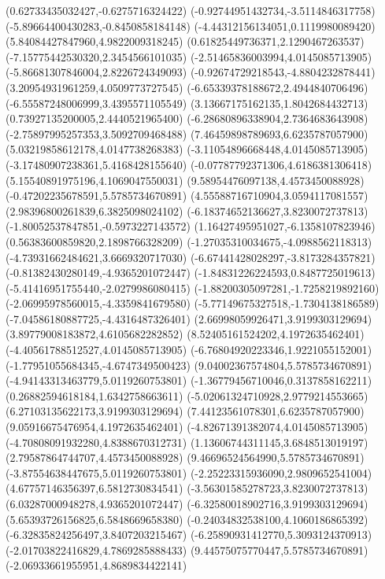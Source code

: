 {(0.62733435032427,-0.6275716324422)
(-0.92744951432734,-3.5114846317758)
(-5.89664400430283,-0.8450858184148)
(-4.44312156134051,0.1119980089420)
(5.84084427847960,4.9822009318245)
(0.61825449736371,2.1290467263537)
(-7.15775442530320,2.3454566101035)
(-2.51465836003994,4.0145085713905)
(-5.86681307846004,2.8226724349093)
(-0.92674729218543,-4.8804232878441)
(3.20954931961259,4.0509773727545)
(-6.65339378188672,2.4944840706496)
(-6.55587248006999,3.4395571105549)
(3.13667175162135,1.8042684432713)
(0.73927135200005,2.4440521965400)
(-6.28680896338904,2.7364683643908)
(-2.75897995257353,3.5092709468488)
(7.46459898789693,6.6235787057900)
(5.03219858612178,4.0147738268383)
(-3.11054896668448,4.0145085713905)
(-3.17480907238361,5.4168428155640)
(-0.07787792371306,4.6186381306418)
(5.15540891975196,4.1069047550031)
(9.58954476097138,4.4573450088928)
(-0.47202235678591,5.5785734670891)
(4.55588716710904,3.0594117081557)
(2.98396800261839,6.3825098024102)
(-6.18374652136627,3.8230072737813)
(-1.80052537847851,-0.5973227143572)
(1.16427495951027,-6.1358107823946)
(0.56383600859820,2.1898766328209)
(-1.27035310034675,-4.0988562118313)
(-4.73931662484621,3.6669320717030)
(-6.67441428028297,-3.8173284357821)
(-0.81382430280149,-4.9365201072447)
(-1.84831226224593,0.8487725019613)
(-5.41416951755440,-2.0279986080415)
(-1.88200305097281,-1.7258219892160)
(-2.06995978560015,-4.3359841679580)
(-5.77149675327518,-1.7304138186589)
(-7.04586180887725,-4.4316487326401)
(2.66998059926471,3.9199303129694)
(3.89779008183872,4.6105682282852)
(8.52405161524202,4.1972635462401)
(-4.40561788512527,4.0145085713905)
(-6.76804920223346,1.9221055152001)
(-1.77951055684345,-4.6747349500423)
(9.04002367574804,5.5785734670891)
(-4.94143313463779,5.0119260753801)
(-1.36779456710046,0.3137858162211)
(0.26882594618184,1.6342758663611)
(-5.02061324710928,2.9779214553665)
(6.27103135622173,3.9199303129694)
(7.44123561078301,6.6235787057900)
(9.05916675476954,4.1972635462401)
(-4.82671391382074,4.0145085713905)
(-4.70808091932280,4.8388670312731)
(1.13606744311145,3.6848513019197)
(2.79587864744707,4.4573450088928)
(9.46696524564990,5.5785734670891)
(-3.87554638447675,5.0119260753801)
(-2.25223315936090,2.9809652541004)
(4.67757146356397,6.5812730834541)
(-3.56301585278723,3.8230072737813)
(6.03287000948278,4.9365201072447)
(-6.32580018902716,3.9199303129694)
(5.65393726156825,6.5848669658380)
(-0.24034832538100,4.1060186865392)
(-6.32835824256497,3.8407203215467)
(-6.25890931412770,5.3093124370913)
(-2.01703822416829,4.7869285888433)
(9.44575075770447,5.5785734670891)
(-2.06933661955951,4.8689834422141)
}
